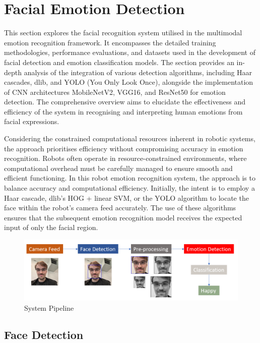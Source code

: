 \chapter{Facial Emotion Detection}

This section explores the facial recognition system utilised in the multimodal emotion recognition framework. It encompasses the detailed training methodologies, performance evaluations, and datasets used in the development of facial detection and emotion classification models. The section provides an in-depth analysis of the integration of various detection algorithms, including Haar cascades, dlib, and YOLO (You Only Look Once), alongside the implementation of CNN architectures MobileNetV2, VGG16, and ResNet50 for emotion detection. The comprehensive overview aims to elucidate the effectiveness and efficiency of the system in recognising and interpreting human emotions from facial expressions.

Considering the constrained computational resources inherent in robotic systems, the approach prioritises efficiency without compromising accuracy in emotion recognition. Robots often operate in resource-constrained environments, where computational overhead must be carefully managed to ensure smooth and efficient functioning. In this robot emotion recognition system, the approach is to balance accuracy and computational efficiency. Initially, the intent is to employ a Haar cascade, dlib's HOG + linear SVM, or the YOLO algorithm to locate the face within the robot's camera feed accurately. The use of these algorithms ensures that the subsequent emotion recognition model receives the expected input of only the facial region.

\begin{figure}[!htb]
    \centering{}
    \includegraphics[scale=0.35]{fed_images/pipeline.png}
    \caption{System Pipeline}
    \label{figure:pipeline}
\end{figure}

\section{Face Detection}

